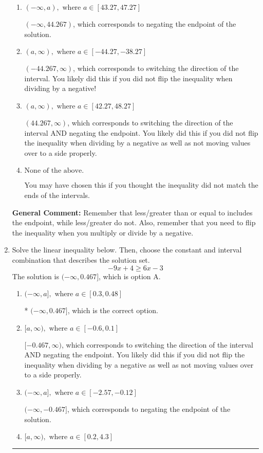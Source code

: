 \documentclass{extbook}[14pt]
\newcommand{\litem}[1]{\item #1

\rule{\textwidth}{0.4pt}}
\begin{document}
\begin{enumerate}
{\begin{enumerate}[label=\Alph*.]
* $(-\infty, -44.267)$, which is the correct option.
\item \( (-\infty, a), \text{ where } a \in [43.27, 47.27] \)

 $(-\infty, 44.267)$, which corresponds to negating the endpoint of the solution.
\item \( (a, \infty), \text{ where } a \in [-44.27, -38.27] \)

 $(-44.267, \infty)$, which corresponds to switching the direction of the interval. You likely did this if you did not flip the inequality when dividing by a negative!
\item \( (a, \infty), \text{ where } a \in [42.27, 48.27] \)

 $(44.267, \infty)$, which corresponds to switching the direction of the interval AND negating the endpoint. You likely did this if you did not flip the inequality when dividing by a negative as well as not moving values over to a side properly.
\item \( \text{None of the above}. \)

You may have chosen this if you thought the inequality did not match the ends of the intervals.
\end{enumerate}

\textbf{General Comment:} Remember that less/greater than or equal to includes the endpoint, while less/greater do not. Also, remember that you need to flip the inequality when you multiply or divide by a negative.
}
\litem{
Solve the linear inequality below. Then, choose the constant and interval combination that describes the solution set.
\[ -9x + 4 \geq 6x -3 \]
The solution is \( (-\infty, 0.467] \), which is option A.\begin{enumerate}[label=\Alph*.]
\item \( (-\infty, a], \text{ where } a \in [0.3, 0.48] \)

* $(-\infty, 0.467]$, which is the correct option.
\item \( [a, \infty), \text{ where } a \in [-0.6, 0.1] \)

 $[-0.467, \infty)$, which corresponds to switching the direction of the interval AND negating the endpoint. You likely did this if you did not flip the inequality when dividing by a negative as well as not moving values over to a side properly.
\item \( (-\infty, a], \text{ where } a \in [-2.57, -0.12] \)

 $(-\infty, -0.467]$, which corresponds to negating the endpoint of the solution.
\item \( [a, \infty), \text{ where } a \in [0.2, 4.3] \)


\end{enumerate}}
\end{enumerate}
\end{document}
